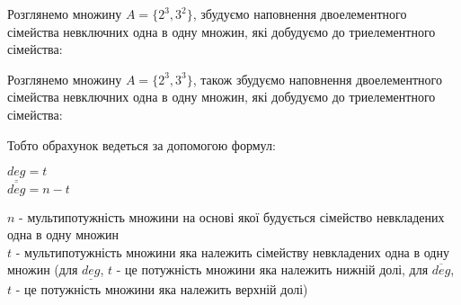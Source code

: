 \begin{example}

Розглянемо множину $ A = \{2^3,3^2\} $, збудуємо наповнення двоелементного сімейства невключних одна в одну множин, які добудуємо до триелементного сімейства:

\begin{center}
\end{center}

\end{example}

\newpage

\begin{example}

Розглянемо множину $ A = \{2^3,3^3\} $, також збудуємо наповнення двоелементного сімейства невключних одна в одну множин, які добудуємо до триелементного сімейства:

\begin{center}
\end{center}
\end{example}

Тобто обрахунок ведеться за допомогою формул:
\begin{center}
$ \underline{deg} = t $
\\
$ \overline{deg} = n - t $
\end{center}
$n$ - мультипотужність множини на основі якої будується сімейство невкладених одна в одну множин
\\
$t$ - мультипотужність множини яка належить сімейству невкладених одна в одну множин (для $\underline{deg}
$, $t$ - це потужність множини яка належить нижній долі, для  $\overline{deg}$, $t$ - це потужність множини яка належить верхній долі)

